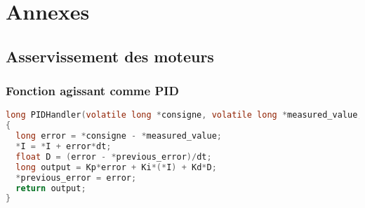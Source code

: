 
\chapter{Annexes}
\label{s:annexes}

\section{Asservissement des moteurs}
\subsection{Fonction agissant comme PID} \label{s:fonction_PID}
\begin{lstlisting}[language=C]
long PIDHandler(volatile long *consigne, volatile long *measured_value, volatile float *I, volatile long *previous_error, float dt)
{
  long error = *consigne - *measured_value;
  *I = *I + error*dt;
  float D = (error - *previous_error)/dt;
  long output = Kp*error + Ki*(*I) + Kd*D;
  *previous_error = error;
  return output;
}
\end{lstlisting}

